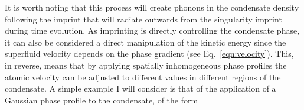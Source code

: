 It is worth noting that this process will create phonons in the condensate density following the imprint that will radiate outwards from the singularity imprint during time evolution. As imprinting is directly controlling the condensate phase, it can also be considered a direct manipulation of the kinetic energy since the superfluid velocity depends on the phase gradient (see Eq.~\eqref{eqn:velocity}). This, in reverse, means that by applying spatially inhomogeneous phase profiles the atomic velocity can be adjusted to different values in different regions of the condensate. A simple example I will consider is that of the application of a Gaussian phase profile to the condensate, of the form

